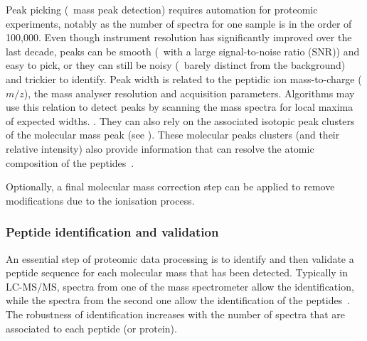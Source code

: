 Peak picking (\ie\ mass peak detection) requires automation
for proteomic experiments,
notably as the number of spectra for one sample is in the order of 100,000.
Even though instrument resolution has significantly improved over the last decade,
peaks can be smooth (\ie\ with a large signal-to-noise ratio (\gls{SNR}))
and easy to pick, or they can still be noisy
(\ie\ barely distinct from the background) and trickier to identify.
Peak width is related to the peptidic ion mass-to-charge ($m/z$),
the mass analyser resolution and acquisition parameters.
Algorithms may use this relation to detect peaks by
scanning the mass spectra for local maxima of expected widths. .
They can also rely on
the associated isotopic peak clusters of the molecular mass peak
(see ).
These molecular peaks clusters (and their relative intensity) also provide
information that can resolve the atomic composition of the peptides~.\mybr\

Optionally, a final molecular mass correction step can be applied to remove
modifications due to the ionisation process.\mybr\


\subsubsection{Peptide identification and validation}\label{subsub:peptideID}

An essential step of proteomic data processing is to identify and then validate
a peptide sequence for each molecular mass that has been detected.
Typically in \gls{LC-MS/MS},
spectra from one of the mass spectrometer allow the identification,
while the spectra from the second one allow
the identification of the peptides~.
The robustness of identification increases
with the number of spectra that are associated to each peptide (or protein).\mybr\


